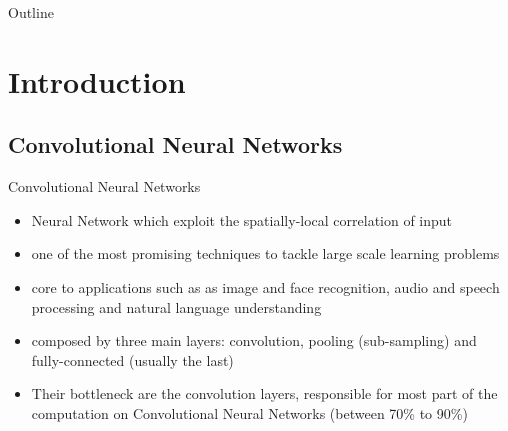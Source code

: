 

\begin{frame}
  \titlepage
\end{frame}

\begin{frame}{Outline}
  \tableofcontents
\end{frame}

\section{Introduction}

\subsection{Convolutional Neural Networks}

\begin{frame}{Convolutional Neural Networks}
\begin{itemize}
  \item {
Neural Network which exploit the spatially-local correlation of input
  }
  \item {
  one of the most promising techniques to tackle large scale learning problems
  }
  \item {
    core to applications such as as image and face recognition, audio and speech processing and natural language understanding
  }
  \item {
  composed by three main layers: convolution, pooling (sub-sampling) and fully-connected (usually the last)
  }
  \item {
   Their bottleneck are the convolution layers, responsible for most part of the computation on Convolutional Neural Networks (between 70\% to 90\%)
  }
  \end{itemize}
\end{frame}

